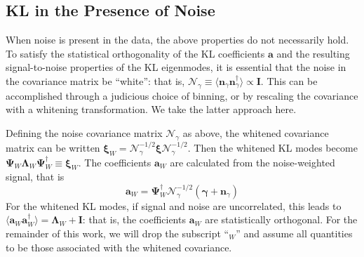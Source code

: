 \documentclass[twocolumn]{emulateapj}
\newcommand{\myvec}[1]{\boldsymbol{#1}}
\newcommand{\mymat}[1]{\boldsymbol{#1}}
\newcommand{\Noise}{\mymat{\mathcal{N}}}
\begin{document}
\subsection{KL in the Presence of Noise}
\label{Adding_Noise}
When noise is present in the data, the above properties do not 
necessarily hold.
To satisfy the statistical orthogonality of the KL coefficients $\myvec{a}$ 
and the resulting signal-to-noise properties of the KL eigenmodes, 
it is essential that the noise in the covariance matrix be ``white'': 
that is, $\Noise_\gamma \equiv 
\langle \myvec{n}_\gamma\myvec{n}_\gamma^\dagger \rangle \propto \mymat{I}$.  
This can be accomplished through a judicious
choice of binning, or by rescaling the covariance with a whitening 
transformation.  We take the latter approach here.

Defining the noise covariance matrix $\Noise_\gamma$ as above,
the whitened covariance matrix can be written 
$\myvec{\xi}_W = \Noise_\gamma^{-1/2} \myvec{\xi} \Noise_\gamma^{-1/2}$.  Then 
the whitened KL modes become
$\myvec{\Psi}_W\myvec{\Lambda}_W\myvec{\Psi}_W^\dagger \equiv \myvec{\xi}_W$.
The coefficients $\myvec{a}_W$ are calculated from the noise-weighted signal,
that is
\begin{equation}
  \myvec{a}_W = \myvec{\Psi}_W^\dagger\Noise_\gamma^{-1/2}
  (\myvec{\gamma}+\myvec{n}_\gamma)
\end{equation}
For the whitened KL modes, if signal and noise are uncorrelated, this leads to 
$\langle\myvec{a}_W\myvec{a}_W^\dagger\rangle = \myvec{\Lambda}_W + \myvec{I}$:
that is, the coefficients $\myvec{a}_W$ are statistically orthogonal.
For the remainder of this work, we will drop the subscript ``$_W$'' and assume
all quantities to be those associated with the whitened covariance.
\end{document}
